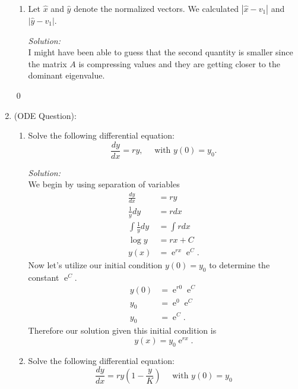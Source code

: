 \documentclass[10pt]{amsart}
\DeclareMathOperator{\E}{e}
\theoremstyle{nonumberplain}
\begin{document}
\begin{enumerate}[label={\bf {Question \arabic*}}]
\begin{enumerate}
\item Let $\hat x$ and $\hat y$ denote the normalized vectors.
We calculated $| \hat x - v_1|$ and $|\hat y - v_1|$.

\textit{Solution:} \\
I might have been able to guess that the second quantity is smaller since the matrix $A$ is compressing values and they are getting closer to the dominant eigenvalue.

\end{enumerate}
\qed \\
\newpage

\item (ODE Question): \\
\begin{enumerate}
\item Solve the following differential equation:
$$\frac{dy}{dx} = ry, \quad \text{ with } y(0) = y_0.$$

\textit{Solution:}\\
We begin by using separation of variables 
\begin{align*}
\frac{dy}{dx} &= ry \\
\frac 1 y dy &= rdx \\
\int \frac 1 y dy &= \int rdx \\
\log y &= rx + C \\
y(x) &= \E^{rx}\E^{C}.
\end{align*}
Now let's utilize our initial condition $y(0) = y_0$ to determine the constant $\E^C$.
\begin{align*}
y(0) &= \E^{r0}\E^C \\
y_0 &= \E^{0}\E^C \\
y_0 &= \E^C.
\end{align*}
Therefore our solution given this initial condition is
$$
y(x) = y_0\E^{rx}.
$$

\item Solve the following differential equation:
$$
\frac{dy}{dx} = ry\left(1 - \frac y K\right) \quad \text{ with } y(0) = y_0
$$


\end{enumerate}
\end{enumerate}
\end{document}
